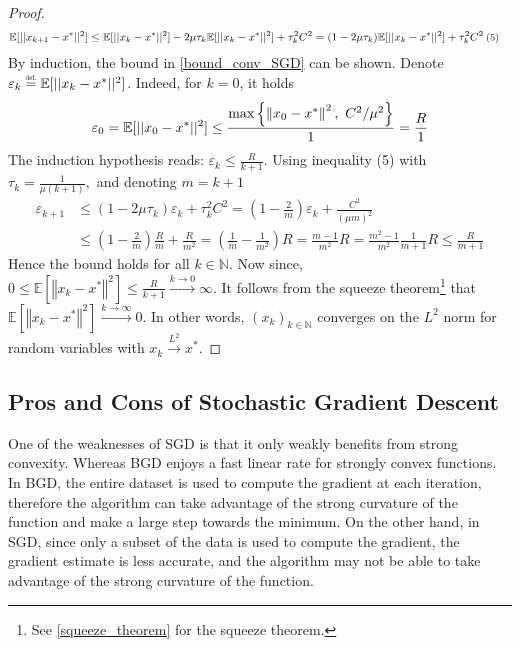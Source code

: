 \begin{proof}
\begin{align}
    &\mathbb{E}[||x_{k+1}-x^{*}||^{2}]\leq \mathbb{E}[||x_{k}-x^{*}||^{2}] - 2\mu \tau_{k} \mathbb{E}[||x_{k}-x^{*}||^{2}] + \tau_{k}^{2} C^{2} = (1 - 2\mu \tau_{k}) \mathbb{E}[||x_{k}-x^{*}||^{2}] + \tau_{k}^{2} C^{2}\nonumber
    \hspace{0.075cm} \text{\scalebox{0.925}{(5)}}
\end{align}
By induction, the bound in \ref{bound_conv_SGD} can be shown. Denote $\varepsilon_{k} \overset{\scalebox{0.5}{def.}}{=} \mathbb{E}[||x_{k}-x^{*}||^{2}]$. Indeed, for $k = 0$, it holds $$\varepsilon_{0} = \mathbb{E}[||x_{0}-x^{*}||^{2}] \leq \frac{\textnormal{max}\left\{\left\Vert x_{0} - x^{*}\right\Vert^{2},\text{ } C^{2}/\mu^{2}\right\}}{1} = \frac{R}{1}$$
The induction hypothesis reads: $\varepsilon_{k} \leq \frac{R}{k+1}.$ Using inequality (5) with $\tau_{k} = \frac{1}{\mu(k+1)},$ and denoting $m = k+1$
\begin{align}
\varepsilon_{k+1}
    &\leq (1-2\mu \tau_{k}) \varepsilon_{k} + \tau_{k}^{2} C^{2} = \left(1-\frac{2}{m}\right)\varepsilon_{k} + \frac{C^{2}}{(\mu m)^{2}}\nonumber\\
    &\leq \left(1 - \frac{2}{m}\right)\frac{R}{m} + \frac{R}{m^{2}} = \left(\frac{1}{m} - \frac{1}{m^{2}}\right)R = \frac{m-1}{m^{2}}R = \frac{m^{2} - 1}{m^{2}}\frac{1}{m + 1}R \leq \frac{R}{m+1}\nonumber
\end{align}
Hence the bound holds for all $k \in \mathbb{N}.$ Now since, $0 \leq \mathbb{E}[\left\Vert x_{k} - x^{*}\right\Vert^{2}] \leq \frac{R}{k+1} \xrightarrow{k \rightarrow 0} \infty$. It follows from the squeeze theorem\footnote{See \ref{squeeze_theorem} for the squeeze theorem.} that $\mathbb{E}[\left\Vert x_{k} - x^{*}\right\Vert^{2}] \xrightarrow{k \rightarrow \infty} 0.$ In other words, $(x_{k})_{k\in\mathbb{N}}$ converges on the $L^{2}$ norm for random variables with $x_{k} \xrightarrow{L^{2}} x^{*}.$ 
\end{proof}

\subsection{Pros and Cons of Stochastic Gradient Descent}
One of the weaknesses of SGD is that it only weakly benefits from strong convexity. Whereas BGD enjoys a fast linear rate for strongly convex functions. In BGD, the entire dataset is used to compute the gradient at each iteration, therefore the algorithm can take advantage of the strong curvature of the function and make a large step towards the minimum. On the other hand, in SGD, since only a subset of the data is used to compute the gradient, the gradient estimate is less accurate, and the algorithm may not be able to take advantage of the strong curvature of the function.

